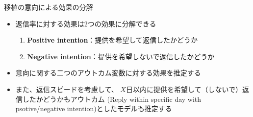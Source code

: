 \documentclass[
      aspectratio=169,
        12pt,
    ]{beamer}
\renewcommand{\textbf}[1]{{\color{DarkBlue}\bfseries#1}}
\providecommand{\tightlist}{%
  \setlength{\itemsep}{0pt}\setlength{\parskip}{0pt}}
\begin{document}
\begin{frame}{移植の意向による効果の分解}
\protect\hypertarget{ux79fbux690dux306eux610fux5411ux306bux3088ux308bux52b9ux679cux306eux5206ux89e3}{}
\begin{itemize}
\tightlist
\item
  返信率に対する効果は2つの効果に分解できる

  \begin{enumerate}
  \tightlist
  \item
    \textbf{Positive intention}：提供を希望して返信したかどうか
  \item
    \textbf{Negative intention}：提供を希望しないで返信したかどうか
  \end{enumerate}
\item
  意向に関する二つのアウトカム変数に対する効果を推定する
\item
  また、返信スピードを考慮して、
  \(X\)日以内に提供を希望して（しないで）返信したかどうかもアウトカム
  (Reply within specific day with psotive/negative intention)としたモデルも推定する
\end{itemize}
\end{frame}
\end{document}
